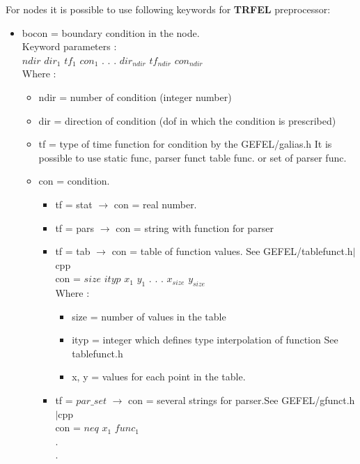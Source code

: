 \documentclass[12pt]{book}
\begin{document}
For nodes it is possible to use following keywords for {\bf TRFEL} preprocessor:
\begin{itemize}
\item bocon = boundary condition in the node.\\
        Keyword parameters :\\
        $ndir$ $dir_1$ $tf_1$ $con_1$ . . . $dir_{ndir}$ $tf_{ndir}$ $con_{ndir}$\\
        Where :\\
        \begin{itemize}
        \item ndir = number of condition (integer number)
        \item dir  = direction of condition (dof in which the condition is prescribed)
        \item tf   = type of time function for condition by the GEFEL/galias.h
               It is possible to use static func, parser funct table func. or
               set of parser func.
        \item con  = condition.
               \begin {itemize}
               \item tf = stat $\to$ con = real number.
               \item tf = pars $\to$ con = string with function for parser
               \item tf = tab  $\to$ con = table of function values. See GEFEL/tablefunct.h$\mid$cpp\\
                    con = $size$ $ityp$ $x_1$ $y_1$ . . . $x_{size}$ $y_{size}$\\
                    Where :
                    \begin{itemize}
                    \item size = number of values in the table
                    \item ityp = integer which defines type interpolation of function
                           See tablefunct.h
                    \item x, y = values for each point in the table.
                    \end{itemize}
               \item tf = $par\_set$ $\to$ con = several strings for parser.See GEFEL/gfunct.h$\mid$cpp\\
               con = $neq$ $x_1$ $func_1$\\
                         .\\
                         .\\

\end{itemize}
\end{itemize}
\end{itemize}
\end{document}
